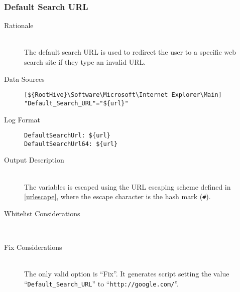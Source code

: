 \subsubsection{Default Search URL}
\begin{description}
\item[Rationale]  \hfill \\ The default search URL is used to redirect the user
to a specific web search site if they type an invalid URL.

\item[Data Sources] \hfill
\vspace{-\baselineskip}
\begin{verbatim}
[${RootHive}\Software\Microsoft\Internet Explorer\Main]
"Default_Search_URL"="${url}"
\end{verbatim}
\item[Log Format] \hfill
\vspace{-\baselineskip}
\begin{verbatim} 
DefaultSearchUrl: ${url}
DefaultSearchUrl64: ${url}
\end{verbatim}
\item[Output Description] \hfill \\
The variables  is escaped using the URL escaping
scheme defined in \ref{urlescape}, where the escape character is the hash mark
(\verb|#|).
\item[Whitelist Considerations] \hfill \\

\item[Fix Considerations] \hfill \\
The only valid option is ``Fix''. It generates script setting the value
``\verb|Default_Search_URL|'' to ``\verb|http://google.com/|''.
\end{description}


